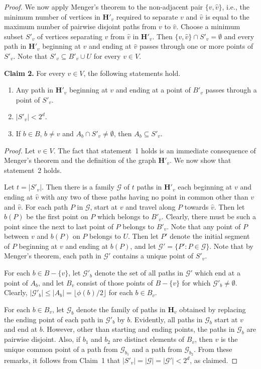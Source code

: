 \documentclass{amsart}
\theoremstyle{remark}
\newcommand{\bfH}{\mathbf{H}}
\begin{document}
\begin{proof}
We now apply Menger's theorem to the non-adjacent pair
$\{v,\hat{v}\}$, i.e., the minimum number of vertices in
$\bfH'_v$ required to separate $v$ and $\hat{v}$ is equal
to the maximum number of pairwise disjoint paths from $v$ to $\hat{v}$.
Choose a minimum subset $S'_v$ of vertices separating
$v$ from $\hat{v}$ in $\bfH'_v$.  Then
$\{v,\hat{v}\}\cap S'_v=\emptyset$ and
every path in $\bfH'_v$ beginning at 
$v$ and ending at $\hat{v}$ passes through one or 
more points of $S'_v$.  Note that $S'_v\subseteq B'_v\cup U$ for
every $v\in V$.  

\medskip
\noindent\textbf{Claim 2.}
For every $v\in V$, the following statements hold.
\begin{enumerate}
\item Any path in $\bfH'_v$ beginning at $v$ and ending at
a point of $B'_v$ passes through a point of $S'_v$.
\item $|S'_v|<2^d$.
\item If $b\in B$, $b\neq v$ and $A_b\cap S'_v\neq\emptyset$,
then $A_b\subseteq S'_v$.
\end{enumerate}  

\medskip
\noindent
\textit{Proof.}  Let $v\in  V$.  The fact that statement~1 holds
is an immediate consequence of Menger's theorem and the definition
of the graph $\bfH'_v$.  We now show that statement~2 holds.

Let $t=|S'_v|$. Then there is a family $\mathcal{G}$ of 
$t$ paths in $\bfH'_v$ each beginning at $v$ and ending at
$\hat{v}$ with any two of these paths having no point in common other 
than $v$ and $\hat{v}$.   For each path $P$ in $\mathcal{G}$,
start at $v$ and travel along $P$ towards $\hat{v}$.
Then let $b(P)$ be the first point on $P$ which belongs to $B'_v$.
Clearly, there must be such a point since the next to last point of
$P$ belongs to $B'_v$.  Note that any point of $P$ between $v$ and
$b(P)$ on $P$ belongs to $U$.  
Then let $P'$ denote the initial segment of 
$P$ beginning at $v$ and ending at $b(P)$,  
and let $\mathcal{G}'=\{P':P\in\mathcal{G}\}$. 
Note that by Menger's theorem,
each path in $\mathcal{G}'$ contains a unique point
of $S'_v$.

For each $b\in B-\{v\}$, let $\mathcal{G}'_b$
denote the set of all paths in $\mathcal{G}'$ which end at
a point of $A_b$, and let $B_v$  consist of those points
of $B-\{v\}$ for which $\mathcal{G}'_b\neq\emptyset$.
Clearly, $|\mathcal{G}'_b|\le|A_b|=
\lfloor\phi(b)/2\rfloor$ for each $b\in B_v$.   

For each $b\in B_v$, let $\mathcal{G}_b$ denote
the family of paths in $\bfH_v$ obtained by replacing the ending
point of each path in $\mathcal{G}'_b$ by $b$.  Evidently, all 
paths in $\mathcal{G}_b$ start
at $v$ and end at $b$.  However, other than starting and
ending points, the paths in $\mathcal{G}_b$ are pairwise disjoint.
Also, if $b_1$ and $b_2$ are distinct
elements of $B_v$, then 
$v$ is the unique common point of a path from $\mathcal{G}_{b_1}$
and a path from $\mathcal{G}_{b_2}$.
From these remarks, it follows from Claim~1 that
$|S'_v|=|\mathcal{G}|=|\mathcal{G}'|<2^d$, as claimed.


\end{proof}
\end{document}
